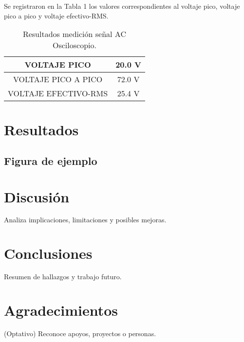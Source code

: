 \documentclass[conference]{IEEEtran} %
\begin{document}
Se registraron en la Tabla 1 los valores correspondientes al voltaje pico, voltaje pico a pico y voltaje efectivo-RMS.
\begin{table}[H]
    \centering
    \caption{Resultados medición señal AC Osciloscopio.}
    \label{tab:ejemplo}
    \begin{tabular}{|c|c|}
        \hline
        VOLTAJE PICO & 20.0 V  \\ \hline
        VOLTAJE PICO A PICO    & 72.0 V     \\ \hline
        VOLTAJE EFECTIVO-RMS   & 25.4 V     \\ \hline
    \end{tabular}
\end{table}



\section{Resultados}
\subsection{Figura de ejemplo}



\section{Discusión}
Analiza implicaciones, limitaciones y posibles mejoras.

\section{Conclusiones}
Resumen de hallazgos y trabajo futuro.

\section*{Agradecimientos}
(Optativo) Reconoce apoyos, proyectos o personas.



\end{document}
